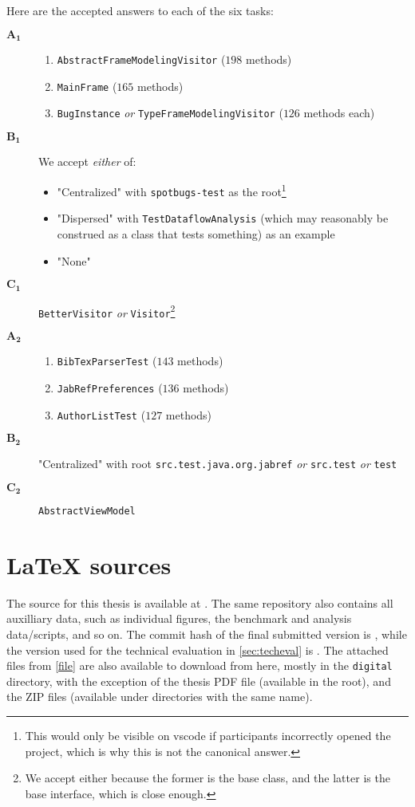 Here are the accepted answers to each of the six tasks:
\begin{description}
	\item[$\bm{A_1}$]
	      \begin{enumerate}
		      \item \texttt{AbstractFrameModelingVisitor} ($198$ methods)
		      \item \texttt{MainFrame} ($165$ methods)
		      \item \texttt{BugInstance} \emph{or} \texttt{TypeFrameModelingVisitor} ($126$ methods each)
	      \end{enumerate}
	\item[$\bm{B_1}$] We accept \emph{either} of:
	      \begin{itemize}
		      \item "Centralized" with \texttt{spotbugs-test} as the root\footnote{
			            This would only be visible on \gls{vscode} if participants incorrectly opened the project, which is why this is not the canonical answer.
		            }
		      \item "Dispersed" with \texttt{TestDataflowAnalysis} (which may reasonably be construed as a class that tests something) as an example
		      \item "None"
	      \end{itemize}
	\item[$\bm{C_1}$] \texttt{BetterVisitor} \emph{or} \texttt{Visitor}\footnote{
		      We accept either because the former is the base class, and the latter is the base interface, which is close enough.
	      }
	\item[$\bm{A_2}$]
	      \begin{enumerate}
		      \item \texttt{BibTexParserTest} ($143$ methods)
		      \item \texttt{JabRefPreferences} ($136$ methods)
		      \item \texttt{AuthorListTest} ($127$ methods)
	      \end{enumerate}
	\item[$\bm{B_2}$] "Centralized" with root \texttt{src.test.java.org.jabref} \emph{or} \texttt{src.test} \emph{or} \texttt{test}
	\item[$\bm{C_2}$] \texttt{AbstractViewModel}
\end{description}

\section{\LaTeX{} sources}\label{app:source}
The source for this thesis is available at .
The same repository also contains all auxilliary data, such as individual figures, the benchmark and analysis data/scripts, and so on.
The commit hash of the final submitted version is , while the version used for the technical evaluation in \cref{sec:techeval} is .
The attached files from \cref{file} are also available to download from here, mostly in the \texttt{digital} directory, with the exception of the thesis PDF file (available in the root), and the ZIP files (available under directories with the same name).
